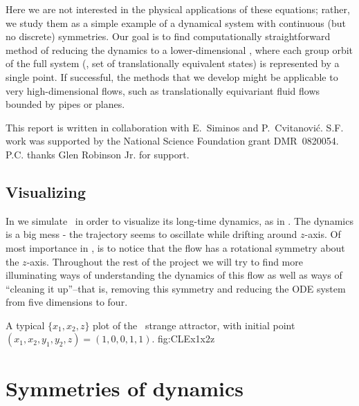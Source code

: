 Here we are not interested in the physical applications of
these equations; rather, we study them as a simple example of
a dynamical system with continuous (but no discrete)
symmetries. Our goal is to find computationally
straightforward method of reducing the dynamics to a
lower-dimensional \statesp, where each group orbit of the
full system (\ie, set of translationally equivalent states)
is represented by a single point. If successful, the methods
that we develop might be applicable to very high-dimensional
flows, such as translationally equivariant fluid flows
bounded by pipes or planes.

This report is written in collaboration with
E.~Siminos and P.~Cvitanovi\'c.
S.F. work was supported by the National Science Foundation
grant DMR~0820054.
P.C. thanks Glen Robinson Jr. for support.

\subsection{Visualizing \cLf}

In  we simulate \cLf\ in order to
visualize its long-time dynamics, as in
. The dynamics is a big mess - the
trajectory seems to oscillate while drifting around $z$-axis.
Of most importance in , is to notice
that the flow has a rotational symmetry about the $z$-axis.
Throughout the rest of the project we will try to find more
illuminating ways of understanding the dynamics of this flow
as well as ways of ``cleaning it up''--that is, removing this
symmetry and reducing the ODE system from five dimensions to
four.

{}{
A typical $\{x_1,x_2,z\}$ plot of the \cLf\ strange attractor,
with initial point
$(x_1, x_2, y_1, y_2, z) = (1, 0, 0, 1, 1)$.
    }{fig:CLEx1x2z}

\section{Symmetries of dynamics}
\label{sect:SymmDyn}

